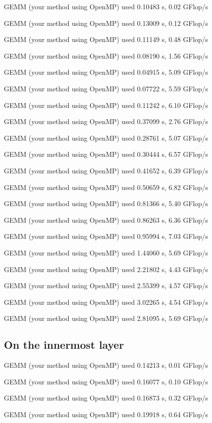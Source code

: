 \documentclass[12pt]{article}
\begin{document}
GEMM (your method using OpenMP) used 0.10483 s, 0.02 GFlop/s

GEMM (your method using OpenMP) used 0.13009 s, 0.12 GFlop/s

GEMM (your method using OpenMP) used 0.11149 s, 0.48 GFlop/s

GEMM (your method using OpenMP) used 0.08190 s, 1.56 GFlop/s

GEMM (your method using OpenMP) used 0.04915 s, 5.09 GFlop/s

GEMM (your method using OpenMP) used 0.07722 s, 5.59 GFlop/s

GEMM (your method using OpenMP) used 0.11242 s, 6.10 GFlop/s

GEMM (your method using OpenMP) used 0.37099 s, 2.76 GFlop/s

GEMM (your method using OpenMP) used 0.28761 s, 5.07 GFlop/s

GEMM (your method using OpenMP) used 0.30444 s, 6.57 GFlop/s

GEMM (your method using OpenMP) used 0.41652 s, 6.39 GFlop/s

GEMM (your method using OpenMP) used 0.50659 s, 6.82 GFlop/s

GEMM (your method using OpenMP) used 0.81366 s, 5.40 GFlop/s

GEMM (your method using OpenMP) used 0.86263 s, 6.36 GFlop/s

GEMM (your method using OpenMP) used 0.95994 s, 7.03 GFlop/s

GEMM (your method using OpenMP) used 1.44060 s, 5.69 GFlop/s

GEMM (your method using OpenMP) used 2.21802 s, 4.43 GFlop/s

GEMM (your method using OpenMP) used 2.55399 s, 4.57 GFlop/s

GEMM (your method using OpenMP) used 3.02265 s, 4.54 GFlop/s

GEMM (your method using OpenMP) used 2.81095 s, 5.69 GFlop/s


\subsection{On the innermost layer}

GEMM (your method using OpenMP) used 0.14213 s, 0.01 GFlop/s

GEMM (your method using OpenMP) used 0.16077 s, 0.10 GFlop/s

GEMM (your method using OpenMP) used 0.16873 s, 0.32 GFlop/s

GEMM (your method using OpenMP) used 0.19918 s, 0.64 GFlop/s
\end{document}

